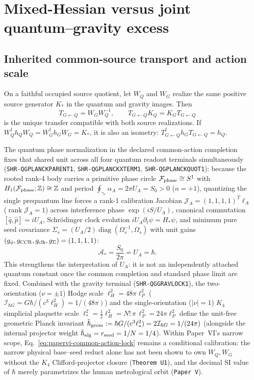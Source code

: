 \documentclass[11pt]{article}
\begin{document}
\section{Mixed-Hessian versus joint quantum--gravity excess}

\subsection{Inherited common-source transport and action scale}

On a faithful occupied source quotient, let $W_Q$ and $W_G$ realize the same
positive source generator $K_*$ in the quantum and gravity images.  Then
\begin{equation}
 T_{G\leftarrow Q}=W_GW_Q^{-1},\qquad
 T_{G\leftarrow Q}K_Q=K_GT_{G\leftarrow Q}
 \label{eq:papervi-qg-natural-transport}
\end{equation}
is the unique transfer compatible with both source realizations.  If
$W_Q^\dagger h_QW_Q=W_G^\dagger h_GW_G=K_*$, it is also an isometry:
$T_{G\leftarrow Q}^\dagger h_GT_{G\leftarrow Q}=h_Q$.

The quantum phase normalization in the declared common-action completion
fixes that shared unit across all four quantum readout terminals simultaneously
(\texttt{SHR-QGPLANCKPARENT1}, \texttt{SHR-QGPLANCKXTERM1}, \texttt{SHR-QGPLANCKQUOT1}):
because the rooted rank-4 body carries a primitive phase circle
$\mathcal F_{\rm phase}\cong S^1$ with $H_1(\mathcal F_{\rm phase};\mathbb Z)\cong\mathbb Z$
and period $\oint_{\gamma_*}\alpha_A=2\pi U_A=S_0>0$ ($n=+1$), quantizing the
single prequantum line forces a rank-1 calibration Jacobian
$\mathcal J_A=(1,1,1,1)^T\ell_A$ ($\operatorname{rank}\mathcal J_A=1$) across
interference phase $\exp(iS/U_A)$, canonical commutation $[\hat q,\hat p]=iU_A$,
Schr\"odinger clock evolution $iU_A\partial_t\psi=H_*\psi$, and minimum pure seed
covariance $\Sigma_s=(U_A/2)\operatorname{diag}(\Omega_s^{-1},\Omega_s)$ with
unit gains $(g_\phi,g_{\rm CCR},g_{\rm clk},g_\Sigma)=(1,1,1,1)$:
\begin{equation}
 \mathcal A_*=\frac{S_0}{2\pi}=U_A=\hbar.
 \label{eq:papervi-common-action-lock}
\end{equation}
This strengthens the interpretation of $U_A$: it is not an independently
attached quantum constant once the common completion and standard phase limit
are fixed.  Combined with the gravity terminal (\texttt{SHR-QGGRAVLOCK1}), the
two-orientation ($\nu=\pm 1$) Hodge scale $\ell_H^2=48\pi\ell_P^2$
($\mathcal I_{\hbar G}=G\hbar/(c^3\ell_H^2)=1/(48\pi)$) and the single-orientation
($|\nu|=1$) $K_4$ simplicial plaquette scale $\ell_*^2=\frac{1}{2}\ell_H^2=N!\,\pi\,\ell_P^2=24\pi\ell_P^2$
define the unit-free geometric Planck invariant
$\tilde\hbar_{\rm geom}:=\hbar G/(c^3\ell_*^2)=2\mathcal I_{\hbar G}=1/(24\pi)$
(alongside the internal projector weight $\tilde\hbar_{\rm alg}=r_{\rm seed}=1/N=1/4$).
Within Paper~VI's narrow scope, Eq.~\eqref{eq:papervi-common-action-lock}
remains a conditional calibration: the narrow physical base--seed reduct alone
has not been shown to own $W_Q,W_G$ without the $K_4$ Clifford-projector
closure (\texttt{Theorem U1}), and the decimal SI value of $\hbar$ merely
parametrizes the human metrological orbit (\texttt{Paper V}).
\end{document}
